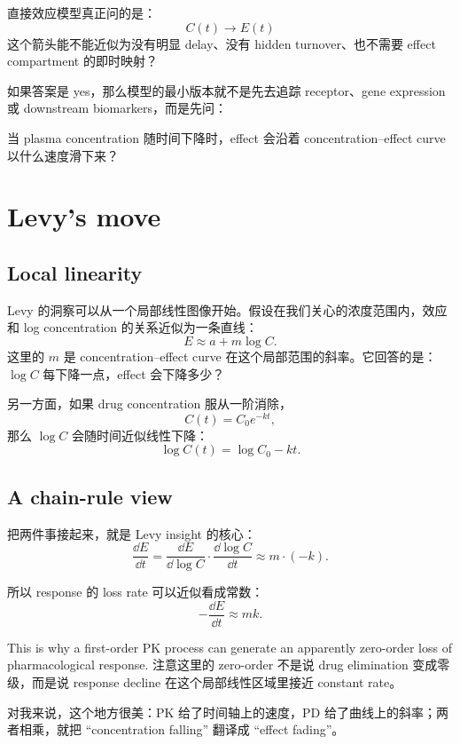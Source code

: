 \documentclass[a4paper]{article}
\begin{document}
直接效应模型真正问的是：
\[
  C(t) \longrightarrow E(t)
\]
这个箭头能不能近似为没有明显 delay、没有 hidden turnover、也不需要 effect compartment 的即时映射？

如果答案是 yes，那么模型的最小版本就不是先去追踪 receptor、gene expression 或 downstream biomarkers，而是先问：

\begin{question}
  当 plasma concentration 随时间下降时，effect 会沿着 concentration--effect curve 以什么速度滑下来？
\end{question}

\section{Levy's move}

\subsection{Local linearity}

Levy 的洞察可以从一个局部线性图像开始。假设在我们关心的浓度范围内，效应和 log concentration 的关系近似为一条直线：
\[
  E \approx a + m \log C.
\]
这里的 \(m\) 是 concentration--effect curve 在这个局部范围的斜率。它回答的是：\(\log C\) 每下降一点，effect 会下降多少？

另一方面，如果 drug concentration 服从一阶消除，
\[
  C(t)=C_0e^{-kt},
\]
那么 \(\log C\) 会随时间近似线性下降：
\[
  \log C(t)=\log C_0-kt.
\]

\subsection{A chain-rule view}

把两件事接起来，就是 Levy insight 的核心：
\[
  \frac{\dd E}{\dd t}
  =
  \frac{\dd E}{\dd \log C}
  \cdot
  \frac{\dd \log C}{\dd t}
  \approx
  m \cdot (-k).
\]

所以 response 的 loss rate 可以近似看成常数：
\[
  -\frac{\dd E}{\dd t}\approx m k.
\]

This is why a first-order PK process can generate an apparently zero-order loss of pharmacological response. 注意这里的 zero-order 不是说 drug elimination 变成零级，而是说 response decline 在这个局部线性区域里接近 constant rate。

\begin{remark}
  对我来说，这个地方很美：PK 给了时间轴上的速度，PD 给了曲线上的斜率；两者相乘，就把 ``concentration falling'' 翻译成 ``effect fading''。
\end{remark}
\end{document}
